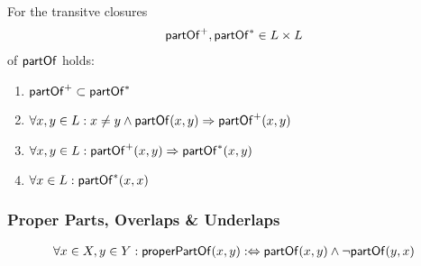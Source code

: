 \documentclass[runningheads,a4paper]{llncs}
\newcommand{\partOf}{\text{\textsf{partOf}}}
\newcommand{\partOfPlus}{\partOf^+}
\newcommand{\partOfStar}{\partOf^*}
\begin{document}
\begin{corollary}
For the transitve closures
\begin{align*}
\partOfPlus, \partOfStar \in L \times L
\end{align*}
of $\partOf$ holds:
\begin{enumerate}

\item 
$\partOfPlus \subset \partOfStar$

\item
$\forall x,y \in L : x \neq y \wedge \partOf(x,y) \Rightarrow \partOfPlus(x,y)$

\item
$\forall x,y \in L : \partOfPlus(x,y) \Rightarrow \partOfStar(x,y)$

\item
$\forall x \in L :\partOfStar(x,x)$

\end{enumerate}
\end{corollary}


\subsubsection{Proper Parts, Overlaps \& Underlaps}

\begin{definition}

\begin{align*}
\forall x \in X, y \in Y: \text{\textsf{properPartOf}}(x,y) :\Leftrightarrow \partOf(x,y) \wedge \neg \partOf(y,x)
\end{align*}

\end{definition}
\end{document}

